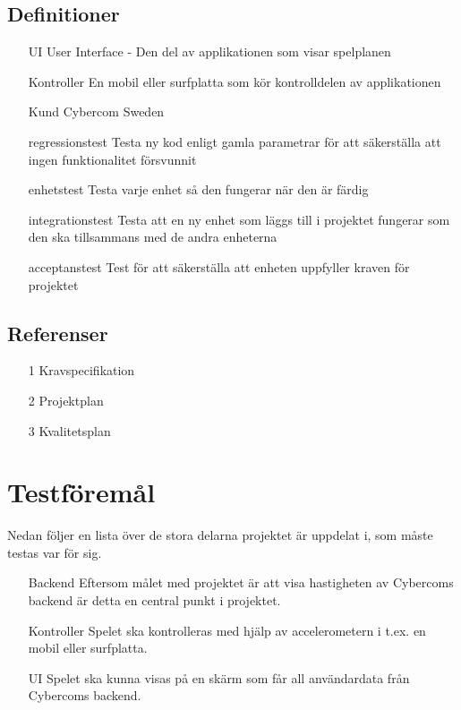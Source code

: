 \documentclass[10pt]{article}
\begin{document}
	\subsection{Definitioner}
		\begin{itemize}
		\item [UI] User Interface - Den del av applikationen som visar spelplanen
		\item [Kontroller] En mobil eller surfplatta som kör kontrolldelen av applikationen
		\item [Kund] Cybercom Sweden
		\item [regressionstest] Testa ny kod enligt gamla parametrar för att säkerställa att ingen funktionalitet försvunnit
		\item [enhetstest] Testa varje enhet så den fungerar när den är färdig
		\item [integrationstest] Testa att en ny enhet som läggs till i projektet fungerar som den ska tillsammans med de andra enheterna
		\item [acceptanstest] Test för att säkerställa att enheten uppfyller kraven för projektet
		\end{itemize}
	
	\subsection{Referenser}
		\begin{itemize}
		\item [1] Kravspecifikation
		\item [2] Projektplan
		\item [3] Kvalitetsplan
		\end{itemize}

	
\section{Testföremål}
	Nedan följer en lista över de stora delarna projektet är uppdelat i, som måste testas var för sig.
	\begin{itemize}
	\item [Backend] Eftersom målet med projektet är att visa hastigheten av Cybercoms backend är detta en central punkt i projektet.
	\item [Kontroller] Spelet ska kontrolleras med hjälp av accelerometern i t.ex. en mobil eller surfplatta.
	\item [UI] Spelet ska kunna visas på en skärm som får all användardata från Cybercoms backend.
	\end{itemize}
	
\end{document}
